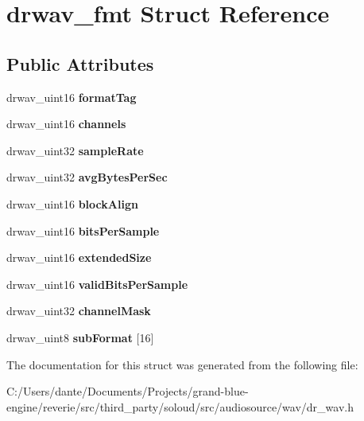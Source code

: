 \hypertarget{structdrwav__fmt}{}\section{drwav\+\_\+fmt Struct Reference}
\label{structdrwav__fmt}
\subsection*{Public Attributes}
\begin{DoxyCompactItemize}
\item 
\mbox{\label{structdrwav__fmt_a4e2484decd3b42c4c5d4076ce6696d33}} 
drwav\+\_\+uint16 {\bfseries format\+Tag}
\item 
\mbox{\label{structdrwav__fmt_ad46fd117a99f918729ab46775c046c37}} 
drwav\+\_\+uint16 {\bfseries channels}
\item 
\mbox{\label{structdrwav__fmt_ab20daecbfedf948d9ed2c34737d0d726}} 
drwav\+\_\+uint32 {\bfseries sample\+Rate}
\item 
\mbox{\label{structdrwav__fmt_a5b7224cb537694f3319a0ebe88cea8f0}} 
drwav\+\_\+uint32 {\bfseries avg\+Bytes\+Per\+Sec}
\item 
\mbox{\label{structdrwav__fmt_acecf247591929bbcab48edf897b336eb}} 
drwav\+\_\+uint16 {\bfseries block\+Align}
\item 
\mbox{\label{structdrwav__fmt_a0bf44f53e540dd652cf6f336446f6d42}} 
drwav\+\_\+uint16 {\bfseries bits\+Per\+Sample}
\item 
\mbox{\label{structdrwav__fmt_af0ae487d3090123258fe0a13cc9273fc}} 
drwav\+\_\+uint16 {\bfseries extended\+Size}
\item 
\mbox{\label{structdrwav__fmt_ae0c5f88e67ed34396dfa9eb91191d768}} 
drwav\+\_\+uint16 {\bfseries valid\+Bits\+Per\+Sample}
\item 
\mbox{\label{structdrwav__fmt_a5d57cd67b6b8143eea7693eb05e034b6}} 
drwav\+\_\+uint32 {\bfseries channel\+Mask}
\item 
\mbox{\label{structdrwav__fmt_ad48c7509db1a73f709e9d4cbd6bddac8}} 
drwav\+\_\+uint8 {\bfseries sub\+Format} \mbox{[}16\mbox{]}
\end{DoxyCompactItemize}


The documentation for this struct was generated from the following file\+:\begin{DoxyCompactItemize}
\item 
C\+:/\+Users/dante/\+Documents/\+Projects/grand-\/blue-\/engine/reverie/src/third\+\_\+party/soloud/src/audiosource/wav/dr\+\_\+wav.\+h\end{DoxyCompactItemize}

